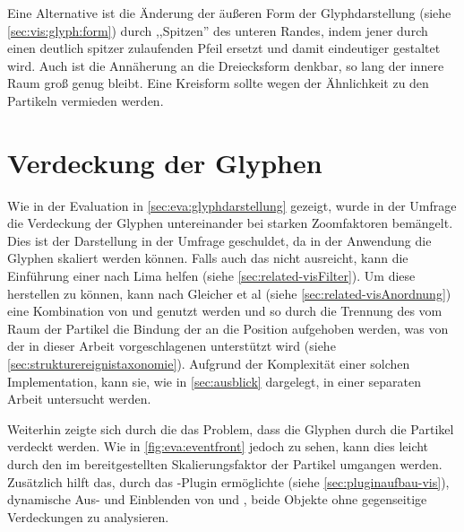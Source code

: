 Eine Alternative ist die Änderung der äußeren Form der Glyphdarstellung (siehe \autoref{sec:vis:glyph:form}) durch ,,Spitzen'' des unteren Randes, indem jener durch einen deutlich spitzer zulaufenden Pfeil ersetzt und damit eindeutiger gestaltet wird. Auch ist die Annäherung an die Dreiecksform denkbar, so lang der innere Raum groß genug bleibt. Eine Kreisform sollte wegen der Ähnlichkeit zu den Partikeln vermieden werden.

\section{Verdeckung der Glyphen}
Wie in der Evaluation in \autoref{sec:eva:glyphdarstellung} gezeigt, wurde in der Umfrage die Verdeckung der Glyphen untereinander bei starken Zoomfaktoren bemängelt. Dies ist der Darstellung in der Umfrage geschuldet, da in der Anwendung die Glyphen skaliert werden können. Falls auch das nicht ausreicht, kann die Einführung einer  nach Lima helfen (siehe \autoref{sec:related-visFilter}). Um diese  herstellen zu können, kann nach Gleicher et al (siehe \autoref{sec:related-visAnordnung}) eine Kombination von  und  genutzt werden und so durch die Trennung des  vom Raum der Partikel die Bindung der  an die Position aufgehoben werden, was von der in dieser Arbeit vorgeschlagenen  unterstützt wird (siehe \autoref{sec:strukturereignistaxonomie}).
Aufgrund der Komplexität einer solchen Implementation, kann sie, wie in \autoref{sec:ausblick} dargelegt, in einer separaten Arbeit untersucht werden. %

Weiterhin zeigte sich durch die  das Problem, dass die Glyphen durch die Partikel verdeckt werden. Wie in \autoref{fig:eva:eventfront} jedoch zu sehen, kann dies leicht durch den im  bereitgestellten Skalierungsfaktor der Partikel umgangen werden. Zusätzlich hilft das, durch das -Plugin  ermöglichte (siehe \autoref{sec:pluginaufbau-vis}), dynamische Aus- und Einblenden von  und , beide Objekte ohne gegenseitige Verdeckungen zu analysieren.


